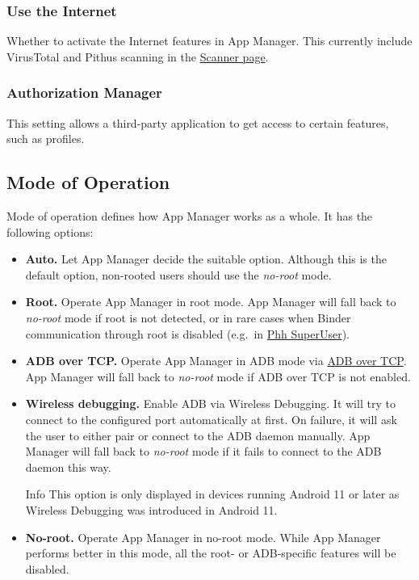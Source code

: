 \subsubsection{Use the Internet}\label{subsubsec:use-the-internet} %
Whether to activate the Internet features in App Manager. This currently include VirusTotal and
Pithus scanning in the \hyperref[sec:scanner-page]{Scanner page}.

\subsubsection{Authorization Manager}\label{subsubsec:auth-manager} %
This setting allows a third-party application to get access to certain features, such as profiles.

\subsection{Mode of Operation}\label{subsec:mode-of-operation} %
Mode of operation defines how App Manager works as a whole. It has the following options:
\begin{itemize}
    \item \textbf{Auto.} Let App Manager decide the suitable option.
    Although this is the default option, non-rooted users should use the \textit{no-root} mode.

    \item \textbf{Root.} Operate App Manager in root mode. App Manager will fall back to \textit{no-root} mode if root
    is not detected, or in rare cases when Binder communication through root is disabled (e.g.\ in \href{https://github.com/MuntashirAkon/AppManager/issues/606}{Phh SuperUser}).

    \item \textbf{ADB over TCP.} Operate App Manager in ADB mode via \hyperref[sec:adb-over-tcp]{ADB over TCP}.
    App Manager will fall back to \textit{no-root} mode if ADB over TCP is not enabled.

    \item \textbf{Wireless debugging.} Enable ADB via Wireless Debugging. It will try to connect to the configured port
    automatically at first. On failure, it will ask the user to either pair or connect to the ADB daemon manually.
    App Manager will fall back to \textit{no-root} mode if it fails to connect to the ADB daemon this way.
    \begin{tip}{Info}
        This option is only displayed in devices running Android 11 or later as Wireless Debugging was introduced in Android 11.
    \end{tip}

    \item \textbf{No-root.} Operate App Manager in no-root mode. While App Manager performs better in this mode,
    all the root- or ADB-specific features will be disabled.
\end{itemize}

